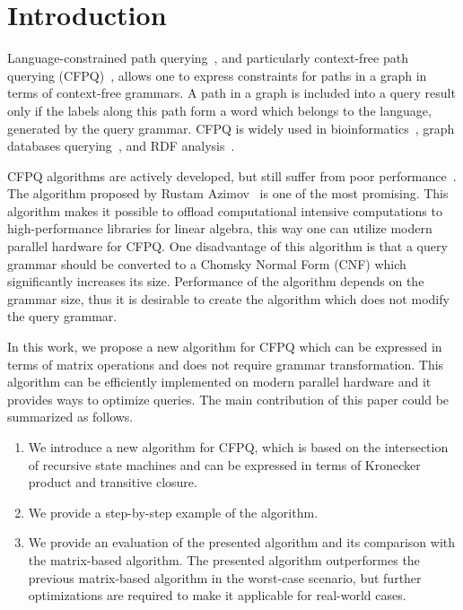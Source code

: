 \section{Introduction}

Language-constrained path querying~\cite{doi:10.1137/S0097539798337716}, and particularly context-free path querying (CFPQ)~\cite{Yannakakis}, allows one to express constraints for paths in a graph in terms of context-free grammars.
A path in a graph is included into a query result only if the labels along this path form a word which belongs to the language, generated by the query grammar.
CFPQ is widely used in bioinformatics~\cite{GraphQueryWithEarley}, graph databases querying~\cite{hellings2015querying,Medeiros:2018:EEC:3167132.3167265,10.1145/3335783.3335791}, and RDF analysis~\cite{RDF}.

CFPQ algorithms are actively developed, but still suffer from poor performance~\cite{10.1145/3335783.3335791}.
The algorithm proposed by Rustam Azimov~\cite{Azimov:2018:CPQ:3210259.3210264} is one of the most promising.
This algorithm makes it possible to offload computational intensive computations to high-performance libraries for linear algebra, this way one can utilize modern parallel hardware for CFPQ.
One disadvantage of this algorithm is that a query grammar should be converted to a Chomsky Normal Form (CNF) which significantly increases its size.
Performance of the algorithm depends on the grammar size, thus it is desirable to create the algorithm which does not modify the query grammar.

In this work, we propose a new algorithm for CFPQ which can be expressed in terms of matrix operations and does not require grammar transformation.
This algorithm can be efficiently implemented on modern parallel hardware and it provides ways to optimize queries.
The main contribution of this paper could be summarized as follows.

\begin{enumerate}
\item We introduce a new algorithm for CFPQ, which is based on the intersection of recursive state machines and can be expressed in terms of Kronecker product and transitive closure.
\item We provide a step-by-step example of the algorithm.
\item We provide an evaluation of the presented algorithm and its comparison with the matrix-based algorithm.
The presented algorithm outperformes the previous matrix-based algorithm in the worst-case scenario, but further optimizations are required to make it applicable for real-world cases.
\end{enumerate}


